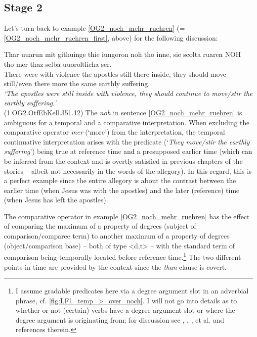 \documentclass[output=paper,
modfonts
]{langscibook}
\begin{document}
\subsection{Stage 2} Let's turn back to example \ref{OG2_noch_mehr_ruehren} (= \ref{OG2_noch_mehr_ruehren_first}, above) for the following discussion:

\ea\gll Thar uuarun mit githuinge thie iungoron noh tho inne, sie scolta ruaren NOH tho mer thaz selba uuoroltlicha ser.\\
       There were with violence the apostles still there inside, they should move still/even there more the same earthly suffering.\\
\glt   \textit{`The apostles were still inside with violence, they should continue to move/stir the earthly suffering.'}\label{OG2_noch_mehr_ruehren} \\ \flushright \vspace{-24pt} (1.OG2.OtfEbKell.351.12)
\z
The \textit{noh} in sentence \ref{OG2_noch_mehr_ruehren} is ambiguous for a temporal and a comparative interpretation. When excluding the comparative operator \textit{mer} (`more') from the interpretation, the temporal continuative interpretation arises with the predicate (`\textit{They move/stir the earthly suffering}') being true at reference time and a presupposed earlier time (which can be inferred from the context and is overtly satisfied in previous chapters of the stories -- albeit not necessarily in the words of the allegory). In this regard, this is a perfect example since the entire allegory is about the contrast between the earlier time (when Jesus was with the apostles) and the later (reference) time (when Jesus has left the apostles). 

The comparative operator in example \ref{OG2_noch_mehr_ruehren} has the effect of comparing the maximum of a property of degrees (subject of comparison/comparee term) to another maximum of a property of degrees (object/comparison base) -- both of type <d,t> -- with the standard term of comparison being temporally located before reference time.\footnote{ I assume gradable predicates here via a degree argument slot in an adverbial phrase, cf. \ref{fig:LF1_temp_>_over_noch}. I will not go into details as to whether or not (certain) verbs have a degree argument slot or where the degree argument is originating from; for discussion see \citeauthor{pinon2008} \citeyearpar{pinon2008}, \citeauthor{rett2013} \citeyearpar{rett2013}, \citeauthor{kennedy_mcnally2005} \citeyearpar{kennedy_mcnally2005}, \citeauthor{kennedy2012} \citeyearpar{kennedy2012} et al. and references therein.} The two different points in time are provided by the context since the \textit{than}-clause is covert.
\end{document}
